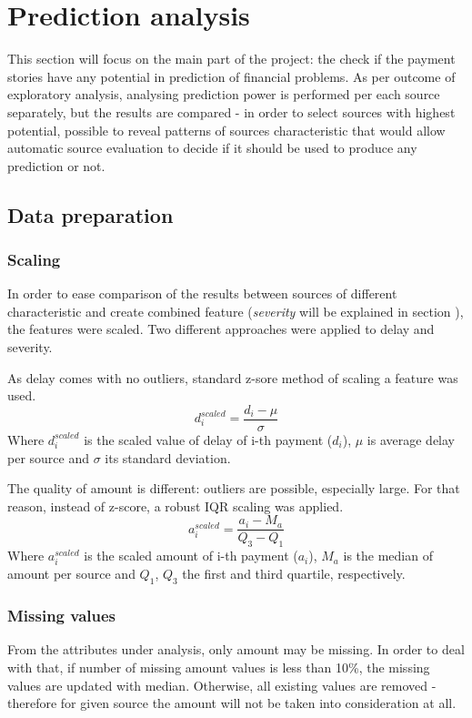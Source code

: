 \documentclass{article}
\begin{document}
\pagebreak

\section{Prediction analysis}
\label{section:prediction-analysis}

This section will focus on the main part of the project: the check if the payment stories have any potential
in prediction of financial problems.
As per outcome of exploratory analysis, analysing prediction power is performed per each source separately,
but the results are compared - in order to select sources with highest potential, possible to reveal patterns of sources characteristic that would allow automatic source evaluation to decide if it should be used to produce any prediction or not.

\subsection{Data preparation}

\subsubsection{Scaling}
In order to ease comparison of the results between sources of different characteristic and
create combined feature (\textit{severity} will be explained in section ), the features were scaled.
Two different approaches were applied to delay and severity.\par
As delay comes with no outliers, standard z-sore method of scaling a feature was used.
\[d_i^{scaled}=\frac{d_i-\mu}{\sigma}\]
Where \(d_i^{scaled}\) is the scaled value of delay of i-th payment (\(d_i\)), $\mu$ is average delay per source and $\sigma$ its standard deviation.
\par
The quality of amount is different: outliers are possible, especially large.
For that reason, instead of z-score, a robust IQR scaling was applied.
\[a_i^{scaled}=\frac{a_i-M_a}{Q_3-Q_1}\]
Where \(a_i^{scaled}\) is the scaled amount of i-th payment (\(a_i\)), \(M_a\) is the median of amount per source and \(Q_1\), \(Q_3\) the first and third quartile, respectively.

\subsubsection{Missing values}
From the attributes under analysis, only amount may be missing.
In order to deal with that, if number of missing amount values is less than 10\%, the missing values are updated with median.
Otherwise, all existing values are removed - therefore for given source the amount will not be taken into consideration at all.
\end{document}
